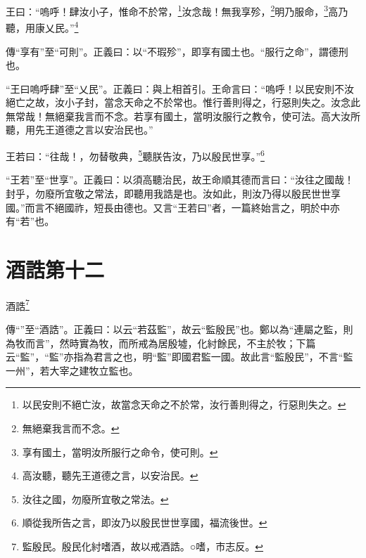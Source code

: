 王曰：“嗚呼！肆汝小子，惟命不於常，\footnote{以民安則不絕亡汝，故當念天命之不於常，汝行善則得之，行惡則失之。}汝念哉！無我享殄，\footnote{無絕棄我言而不念。}明乃服命，\footnote{享有國土，當明汝所服行之命令，使可則。}高乃聽，用康乂民。”\footnote{高汝聽，聽先王道德之言，以安治民。}


{\noindent\zhuan{}\fzbyks 傳“享有”至“可則”。正義曰：以“不瑕殄”，即享有國土也。“服行之命”，謂德刑也。 \par}

{\noindent\shu{}\fzkt “王曰嗚呼肆”至“乂民”。正義曰：與上相首引。王命言曰：“嗚呼！以民安則不汝絕亡之故，汝小子封，當念天命之不於常也。惟行善則得之，行惡則失之。汝念此無常哉！無絕棄我言而不念。若享有國土，當明汝服行之教令，使可法。高大汝所聽，用先王道德之言以安治民也。” \par}

王若曰：“往哉！，勿替敬典，\footnote{汝往之國，勿廢所宜敬之常法。}聽朕告汝，乃以殷民世享。”\footnote{順從我所告之言，即汝乃以殷民世世享國，福流後世。}

{\noindent\shu{}\fzkt “王若”至“世享”。正義曰：以須高聽治民，故王命順其德而言曰：“汝往之國哉！封乎，勿廢所宜敬之常法，即聽用我誥是也。汝如此，則汝乃得以殷民世世享國。”而言不絕國祚，短長由德也。又言“王若曰”者，一篇終始言之，明於中亦有“若”也。 \par}

\section{酒誥第十二}


酒誥\footnote{監殷民。殷民化紂嗜酒，故以戒酒誥。○嗜，巿志反。}

{\noindent\shu{}\fzkt 傳“”至“酒誥”。正義曰：以云“若茲監”，故云“監殷民”也。鄭以為“連屬之監，則為牧而言”，然時實為牧，而所戒為居殷墟，化紂餘民，不主於牧；下篇云“監”，“監”亦指為君言之也，明“監”即國君監一國。故此言“監殷民”，不言“監一州”，若大宰之建牧立監也。 \par}

